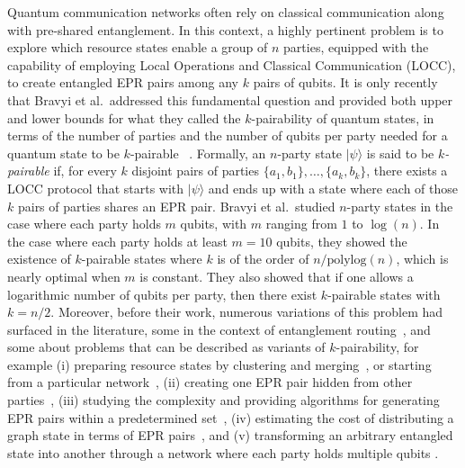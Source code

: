 \documentclass[a4paper,UKenglish,cleveref, autoref, thm-restate]{arxiv}
\newcommand{\ket}[1]{{\ensuremath{\lvert#1\rangle}}}
\begin{document}
Quantum communication networks often rely on classical communication along with pre-shared entanglement. 
In this context, a highly pertinent problem is to explore which resource states enable a group of $n$ parties, equipped with the capability of employing Local  Operations and Classical Communication (LOCC), to create entangled EPR pairs among any $k$ pairs of qubits. It is only recently that Bravyi et al.~addressed this fundamental question and provided both upper and lower bounds for what they called the $k$-pairability of quantum states, in terms of the number of parties and the number of qubits per party needed for a quantum state to be $k$-pairable ~\cite{bravyi2022generating}. Formally, an $n$-party state $\ket \psi$ is said to be \textit{$k$-pairable} if, for every $k$ disjoint pairs of parties  $\{a_1, b_1\},\ldots,\{a_k, b_k\}$, there exists a LOCC protocol that starts with $\ket \psi$ and ends up with a state where each of those $k$ pairs of parties shares an EPR pair. Bravyi et al.~studied $n$-party states in the case where each party holds  $m$ qubits, with $m$ ranging from $1$ to $\log(n)$. In the case where each party holds at least $m = 10$ qubits, they showed the existence of $k$-pairable states where $k$ is of the order of $n/ \text{polylog}(n)$, which is nearly optimal when $m$ is constant. They also showed that if one allows a logarithmic number of qubits per party, then there exist $k$-pairable states with $k = n/ 2$. Moreover, before their work, numerous variations of this problem had surfaced in the literature, some in the context of entanglement routing~\cite{schoute2016shortcuts,hahn2019quantum,pant2019routing}, and some about problems that can be described as variants of $k$-pairability, for example (i) preparing resource states by clustering and merging~\cite{Miguel_Ramiro_2023}, or  starting from a particular network~\cite{DSL:multipoint,Contreras_Tejada_2022}, (ii) creating one EPR pair hidden from other parties~\cite{illianoetal}, (iii) studying the complexity and providing algorithms for generating EPR pairs within a predetermined set~\cite{dahlberg2020transforming,DHW:howtotransform}, (iv) estimating the cost of distributing a graph state in terms of EPR pairs~\cite{meignant2019distributing,fischer2021distributing}, and (v) transforming an arbitrary entangled state into another through a network where each party holds multiple qubits \cite{christandl2023resource}. 
\end{document}
